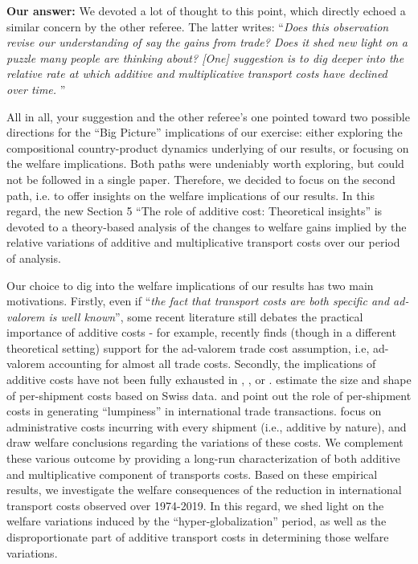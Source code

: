 \documentclass[a4paper,11pt]{article}
\begin{document}
\textbf{Our answer:} We devoted a lot of thought to this point, which directly echoed a similar concern by the other referee. The latter writes: ``\emph{Does this observation revise our understanding of say the gains from trade? Does it shed new light on a puzzle many people are thinking about? [One] suggestion is to dig deeper into the relative rate at which additive and multiplicative transport costs have declined over time.}
''

All in all, your suggestion and the other referee's one pointed toward two possible directions for the ``Big Picture'' implications of our exercise: either exploring the compositional country-product dynamics underlying of our results, or focusing on the welfare implications. Both paths were undeniably worth exploring, but could not be followed in a single paper. Therefore, we decided to focus on the second path, i.e. to  offer insights on the welfare implications of our results. In this regard, the new Section 5 ``The role of additive cost: Theoretical insights'' is devoted to a theory-based analysis of the changes to welfare gains implied by the relative variations of additive and multiplicative transport costs over our period of analysis.

Our choice to dig into the welfare implications of our results has two main motivations. Firstly, even if ``\emph{the fact that transport costs are both specific and ad-valorem is well known}'', some recent literature still debates the practical importance of additive costs - for example, \cite{Lashkaripour_JIE2020} recently finds (though in a different theoretical setting) support for the ad-valorem trade cost assumption, i.e, ad-valorem accounting for almost all trade costs. Secondly, the implications of additive costs have not been fully exhausted in \citet{Irrazabal_2015}, \cite{Hornok-et-al-RES-2015, Hornok-et-al-JIE-2015}, \cite{Alessandria-et-al-AER-2010} or \citet{sorensen2014}. \cite{Kropf-Saure-JIE-2016} estimate the size and shape of per-shipment costs based on Swiss data. \cite{Alessandria-et-al-AER-2010} and \cite{Hornok-et-al-RES-2015} point out the role of per-shipment costs in generating ``lumpiness'' in international trade transactions. \cite{Hornok-et-al-JIE-2015} focus on administrative costs incurring with every shipment (i.e., additive by nature), and draw welfare conclusions regarding the variations of these costs. We complement these various outcome by providing a long-run characterization of both additive and multiplicative component of transports costs. Based on these empirical results, we investigate the welfare consequences of the reduction in international transport costs observed over 1974-2019. In this regard, we shed light on the welfare variations induced by the ``hyper-globalization'' period, as well as the disproportionate part of additive transport costs in determining those welfare variations.\smallskip
\end{document}
